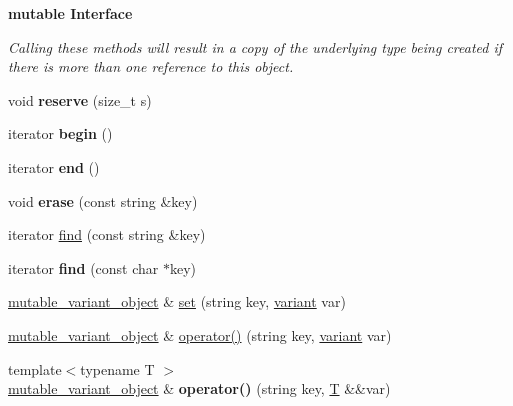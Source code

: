 \begin{Indent}\textbf{ mutable Interface}\par
{\em Calling these methods will result in a copy of the underlying type being created if there is more than one reference to this object. }\begin{DoxyCompactItemize}
\item 
\mbox{\label{classfc_1_1mutable__variant__object_a5da217a80318bf1587bae008741a0780}} 
void {\bfseries reserve} (size\+\_\+t s)
\item 
\mbox{\label{classfc_1_1mutable__variant__object_a009f002bdff54a6bd6ac507f04052e53}} 
iterator {\bfseries begin} ()
\item 
\mbox{\label{classfc_1_1mutable__variant__object_aba444f933d42d3c21facfbad1ecd45e0}} 
iterator {\bfseries end} ()
\item 
\mbox{\label{classfc_1_1mutable__variant__object_ada38caab5cc7624046cc61fcd033c4db}} 
void {\bfseries erase} (const string \&key)
\item 
iterator \mbox{\hyperlink{classfc_1_1mutable__variant__object_ae3b38166303f37671545d2a35ba23dc6}{find}} (const string \&key)
\item 
\mbox{\label{classfc_1_1mutable__variant__object_a1236a6f2ce7aa5f42245bd7ee7335ac5}} 
iterator {\bfseries find} (const char $\ast$key)
\item 
\mbox{\hyperlink{classfc_1_1mutable__variant__object}{mutable\+\_\+variant\+\_\+object}} \& \mbox{\hyperlink{classfc_1_1mutable__variant__object_af9dc6ef0475bae644c8904eb4607b6e0}{set}} (string key, \mbox{\hyperlink{classfc_1_1variant}{variant}} var)
\item 
\mbox{\hyperlink{classfc_1_1mutable__variant__object}{mutable\+\_\+variant\+\_\+object}} \& \mbox{\hyperlink{classfc_1_1mutable__variant__object_a2264868c8516f3a7558cd4f530673cd6}{operator()}} (string key, \mbox{\hyperlink{classfc_1_1variant}{variant}} var)
\item 
\mbox{\label{classfc_1_1mutable__variant__object_a62f2f2248cc9f9c873975f6720a0a79e}} 
{\footnotesize template$<$typename T $>$ }\\\mbox{\hyperlink{classfc_1_1mutable__variant__object}{mutable\+\_\+variant\+\_\+object}} \& {\bfseries operator()} (string key, \mbox{\hyperlink{struct_t}{T}} \&\&var)

\end{DoxyCompactItemize}
\end{Indent}
